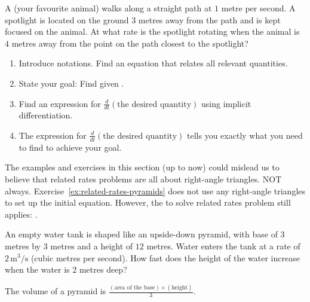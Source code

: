 \documentclass[../main.tex]{subfiles}
\begin{document}
\begin{exercise} \label{ex:related-rates-intro}
  A \underline{\hspace{1.5in}} (your favourite animal) walks along a straight path at \(1\) metre per second.  A spotlight is located on the ground \(3\) metres away from the path and is kept focused on the animal. At what rate is the spotlight rotating when the animal is \(4\) metres away from the point on the path closest to the spotlight?

  \begin{enumerate}[wide, label=(Step~\arabic*).]
    \item Introduce notations. Find an equation that relates all relevant quantities.


    \item State your goal: Find \underline{\hspace{1in}} given \underline{\hspace{3in}}.

    \item Find an expression for \(\frac{d}{dt}(\text{the desired quantity})\) using implicit differentiation.


    \item The expression for \(\frac{d}{dt}\left( \text{the desired quantity} \right)\) tells you exactly what you need to find to achieve your goal.

  \end{enumerate}
\end{exercise}
\clearpage

The examples and exercises in this section (up to now) could mislead us to believe that related rates problems are all about right-angle triangles. NOT always. Exercise~\ref{ex:related-rates-pyramids} does not use any right-angle triangles to set up the initial equation. However, the  to solve related rates problem still applies: . 

\begin{exercise} \label{ex:related-rates-pyramids}
  An empty water tank is shaped like an upside-down pyramid, with base of \(3\) metres by \(3\) metres and a height of \(12\) metres. Water enters the tank at a rate of \(2\,\text{m}^{3}/\text{s}\) (cubic metres per second). How fast does the height of the water increase when the water is \(2\) metres deep? 

  The volume of a pyramid is \(\frac{(\text{area of the base}) \times (\text{height})}{3}\).

\end{exercise}
\end{document}
